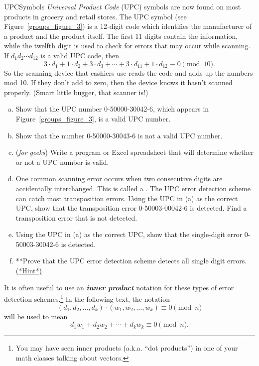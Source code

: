 \begin{exercise}{UPCSymbols} \emph{Universal Product Code}
 (UPC) symbols are now found on most 
products in grocery and retail stores. The UPC symbol (see Figure~\ref{groups_figure_3}) is a 12-digit
code which identifies the manufacturer of a product and the product itself. The first 11 digits contain the information, while the twelfth digit is used to check for errors that may occur while scanning. If $d_1 d_2
\cdots d_{12}$ is a valid UPC code, then  
\[
3 \cdot d_1 + 1 \cdot d_2 + 3 \cdot d_3 + \cdots + 3 \cdot
d_{11} + 1 \cdot d_{12} \equiv 0 \pmod{10}.
\]
So the scanning device that cashiers use reads the code and adds up the numbers mod 10. If they don't add to zero, then the device knows it hasn't scanned properly. 
(Smart little bugger, that scanner is!)

\begin{enumerate}[(a)]
\item
Show that the UPC number  0-50000-30042-6, which appears in
Figure~\ref{groups_figure_3}, is a valid UPC number. 
 
\item
Show that the number 0-50000-30043-6 is not a valid UPC number.
 
\item (\emph{for geeks}) Write a program or Excel spreadsheet that will determine whether or not a UPC number is valid. 

\item
One common scanning error occurs when two consecutive digits are accidentally interchanged. This is called a . 
The  UPC error detection scheme can catch most transposition errors.  Using the UPC in (a) as the correct UPC, show that the transposition error 0-50003-00042-6 is detected.  Find a transposition error that is not detected. 

\item
 Using the UPC in (a) as the correct UPC, show that the single-digit error 0-50003-30042-6 is detected.  
\item
**Prove that the UPC error detection scheme detects all single digit errors. 
\hyperref[sec:modular_arithmetic:hints]{(*Hint*)}   
\end{enumerate}
\end{exercise} 
 

It is often useful to use an \textbf{\emph{inner product}} notation for these types of error detection schemes.\footnote{You may have seen inner products (a.k.a. ``dot products'') in one of your math classes talking about vectors.} In the following text, the notation
\[
(d_1, d_2, \ldots, d_k ) \cdot (w_1, w_2, \ldots, w_k ) \equiv 0 \pmod{ n }
\]
will be used to mean
\[
d_1 w_1 +  d_2 w_2 + \cdots +  d_k w_k  \equiv 0  \pmod{ n}.
\]

